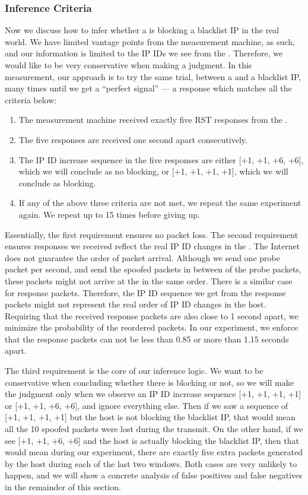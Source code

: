 \subsubsection{Inference Criteria}
Now we discuss how to infer whether a {} is blocking a blacklist IP
in the real world. We have limited vantage points from the measurement machine, as
such, and our information is limited to the IP IDs we see from the {}.
Therefore, we would like to be very conservative when making a judgment. In this
measurement, our approach is to try the same trial, between a {} and a
blacklist IP, many times until we get a ``perfect signal'' --- a response
which matches all the criteria below:

\begin{enumerate}
    \item The measurement machine received exactly five RST responses from the {}.
    \item The five responses are received one second apart consecutively.
    \item The IP ID increase sequence in the five responses are either [+1, +1, +6, +6],
    which we will conclude as no blocking, or [+1, +1, +1, +1], which we will
    conclude as blocking.
    \item If any of the above three criteria are not met, we repeat the same experiment
    again. We repeat up to 15 times before giving up.
\end{enumerate}

Essentially, the first requirement ensures no packet loss. The second
requirement ensures responses we received reflect the real IP ID changes in
the {}. The Internet does not guarantee the order of packet arrival.
Although we send one probe packet per second, and send the spoofed
packets in between of the probe packets, these packets might not arrive at
the {} in the same order. There is a similar case for response packets.
Therefore, the IP ID sequence we get from the response packets
might not represent the real order of IP ID changes in the host. Requiring
that
the received response packets are also close to 1 second apart, we minimize
the probability of the reordered packets. In our experiment, we enforce that
the response packets can not be less than 0.85 or more than 1.15 seconds
apart.

The third requirement is the core of our inference logic. We want to be
conservative when concluding whether there is blocking or not, so we will
make the judgment only when we observe an IP ID increase sequence [+1, +1, +1,
+1] or [+1, +1, +6, +6], and ignore everything else. Then if we saw a
sequence of [+1, +1, +1, +1] but the host is not blocking the blacklist IP,
that would mean all the 10 spoofed packets were lost during the transmit. On
the other hand, if we see [+1, +1, +6, +6] and the host is actually blocking
the blacklist IP, then that would mean during our experiment, there are
exactly five extra packets generated by the host during each of the last two
windows. Both cases are very unlikely to happen, and we will show a concrete
analysis of false positives and false negatives in the remainder of this section.


